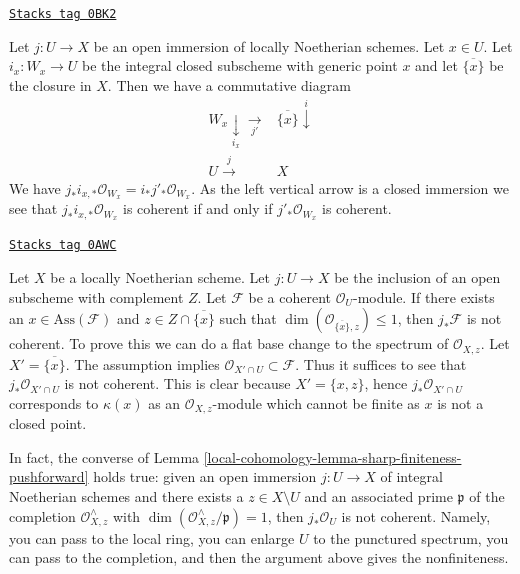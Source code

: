 \begin{remark}[Closure]
\label{local-cohomology-remark-closure}
\href{https://stacks.math.columbia.edu/tag/0BK2}{\texttt{Stacks tag 0BK2}}

Let $j : U \to X$ be an open immersion of locally Noetherian schemes.
Let $x \in U$. Let $i_x : W_x \to U$ be the integral closed subscheme
with generic point $x$ and let $\overline{\{x\}}$ be the closure in $X$.
Then we have a commutative diagram
$$
\begin{array}{cc}W_x \underset{i_x}{\downarrow}\underset{j'}{\longrightarrow} & \overline{\{x\}} \overset{i}{\downarrow} \\ U \overset{j}{\longrightarrow} & X\end{array}
$$
We have $j_*i_{x, *}\mathcal{O}_{W_x} = i_*j'_*\mathcal{O}_{W_x}$.
As the left vertical arrow is a closed immersion we see that
$j_*i_{x, *}\mathcal{O}_{W_x}$ is coherent if and only if
$j'_*\mathcal{O}_{W_x}$ is coherent.
\end{remark}

\begin{remark}
\label{local-cohomology-remark-no-finiteness-pushforward}
\href{https://stacks.math.columbia.edu/tag/0AWC}{\texttt{Stacks tag 0AWC}}

Let $X$ be a locally Noetherian scheme. Let $j : U \to X$ be the inclusion of
an open subscheme with complement $Z$. Let $\mathcal{F}$ be a coherent
$\mathcal{O}_U$-module. If there exists an $x \in \text{Ass}(\mathcal{F})$ and
$z \in Z \cap \overline{\{x\}}$ such that
$\dim(\mathcal{O}_{\overline{\{x\}}, z}) \leq 1$, then $j_*\mathcal{F}$ is not
coherent. To prove this we can do a flat base change to the spectrum
of $\mathcal{O}_{X, z}$. Let $X' = \overline{\{x\}}$.
The assumption implies $\mathcal{O}_{X' \cap U} \subset \mathcal{F}$.
Thus it suffices to see that $j_*\mathcal{O}_{X' \cap U}$ is not
coherent. This is clear because $X' = \{x, z\}$, hence
$j_*\mathcal{O}_{X' \cap U}$ corresponds to $\kappa(x)$ as an
$\mathcal{O}_{X, z}$-module which cannot be finite as $x$ is not
a closed point.

\medskip\noindent
In fact, the converse of Lemma \ref{local-cohomology-lemma-sharp-finiteness-pushforward}
holds true: given an open immersion $j : U \to X$ of integral Noetherian
schemes and there exists a $z \in X \setminus U$ and an associated prime
$\mathfrak p$ of the completion $\mathcal{O}_{X, z}^\wedge$
with $\dim(\mathcal{O}_{X, z}^\wedge/\mathfrak p) = 1$,
then $j_*\mathcal{O}_U$ is not coherent. Namely, you can pass to
the local ring, you can enlarge $U$ to the punctured spectrum,
you can pass to the completion, and then the argument above gives
the nonfiniteness.
\end{remark}

